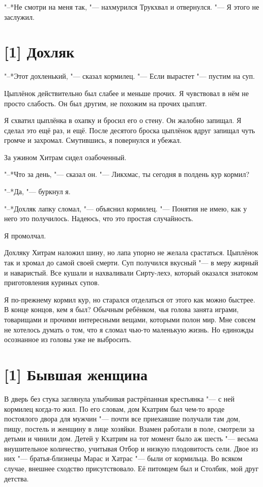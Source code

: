 "--*Не смотри на меня так, "--- нахмурился Трукхвал и отвернулся.
"--- Я этого не заслужил.

\section{[1] Дохляк}

"--*Этот дохленький, "--- сказал кормилец.
"--- Если вырастет "--- пустим на суп.

Цыплёнок действительно был слабее и меньше прочих.
Я чувствовал в нём не просто слабость.
Он был другим, не похожим на прочих цыплят.

Я схватил цыплёнка в охапку и бросил его о стену.
Он жалобно запищал.
Я сделал это ещё раз, и ещё.
После десятого броска цыплёнок вдруг запищал чуть громче и захромал.
Смутившись, я повернулся и убежал.

За ужином Хитрам сидел озабоченный.

"--*Что за день, "--- сказал он.
"--- Ликхмас, ты сегодня в полдень кур кормил?

"--*Да, "--- буркнул я.

"--*Дохляк лапку сломал, "--- объяснил кормилец.
"--- Понятия не имею, как у него это получилось.
Надеюсь, что это простая случайность.

Я промолчал.

Дохляку Хитрам наложил шину, но лапа упорно не желала срастаться.
Цыплёнок так и хромал до самой своей смерти.
Суп получился вкусный "--- в меру жирный и наваристый.
Все кушали и нахваливали Сирту-лехэ, который оказался знатоком приготовления куриных супов.

Я по-прежнему кормил кур, но старался отделаться от этого как можно быстрее.
В конце концов, кем я был?
Обычным ребёнком, чья голова занята играми, товарищами и прочими интересными вещами, которыми полон мир.
Мне совсем не хотелось думать о том, что я сломал чью-то маленькую жизнь.
Но единожды осознанное из головы уже не выбросить.

\section{[1] Бывшая женщина}

В дверь без стука заглянула улыбчивая растрёпанная крестьянка "--- с ней кормилец когда-то жил.
По его словам, дом Кхатрим был чем-то вроде постоялого двора для мужчин "--- почти все приехавшие получали там дом, пищу, постель и женщину в лице хозяйки.
Взамен работали в поле, смотрели за детьми и чинили дом.
Детей у Кхатрим на тот момент было аж шесть "--- весьма внушительное количество, учитывая Отбор и низкую плодовитость сели.
Двое из них "--- братья-близнецы Марас и Хатрас "--- были от кормильца.
Во всяком случае, внешнее сходство присутствовало.
Её питомцем был и Столбик, мой друг детства.


